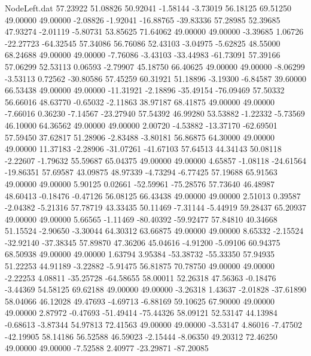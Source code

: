 \begin{filecontents}{NodeLeft.dat}
  57.23922   51.08826   50.92041    -1.58144   -3.73019   56.18125   69.51250   49.00000   49.00000   -2.08826   -1.92041  -16.88765  -39.83336
  57.28985   52.39685   47.93274    -2.01119   -5.80731   53.85625   71.64062   49.00000   49.00000   -3.39685    1.06726  -22.27723  -64.32545
  57.34086   56.76086   52.43103    -3.04975   -5.62825   48.55000   68.24688   49.00000   49.00000   -7.76086   -3.43103  -33.44983  -61.73091
  57.39166   57.06299   52.53113     0.06593   -2.79907   45.18750   66.40625   49.00000   49.00000   -8.06299   -3.53113    0.72562  -30.80586
  57.45259   60.31921   51.18896    -3.19300   -6.84587   39.60000   66.53438   49.00000   49.00000  -11.31921   -2.18896  -35.49154  -76.09469
  57.50332   56.66016   48.63770    -0.65032   -2.11863   38.97187   68.41875   49.00000   49.00000   -7.66016    0.36230   -7.14567  -23.27940
  57.54392   46.99280   53.53882    -1.22332   -5.73569   46.10000   64.36562   49.00000   49.00000    2.00720   -4.53882  -13.37170  -62.69501
  57.59450   37.62817   51.28906    -2.83488   -3.80181   56.86875   64.30000   49.00000   49.00000   11.37183   -2.28906  -31.07261  -41.67103
  57.64513   44.34143   50.08118    -2.22607   -1.79632   55.59687   65.04375   49.00000   49.00000    4.65857   -1.08118  -24.61564  -19.86351
  57.69587   43.09875   48.97339    -4.73294   -6.77425   57.19688   65.91563   49.00000   49.00000    5.90125    0.02661  -52.59961  -75.28576
  57.73640   46.48987   48.60413    -0.18476   -0.47126   56.08125   66.43438   49.00000   49.00000    2.51013    0.39587   -2.04382   -5.21316
  57.78719   43.33435   50.11469    -7.31144   -5.44919   59.28437   65.20937   49.00000   49.00000    5.66565   -1.11469  -80.40392  -59.92477
  57.84810   40.34668   51.15524    -2.90650   -3.30044   64.30312   63.66875   49.00000   49.00000    8.65332   -2.15524  -32.92140  -37.38345
  57.89870   47.36206   45.04616    -4.91200   -5.09106   60.94375   68.50938   49.00000   49.00000    1.63794    3.95384  -53.38732  -55.33350
  57.94935   51.22253   44.91189    -3.22882   -5.91475   56.81875   70.78750   49.00000   49.00000   -2.22253    4.08811  -35.25728  -64.58655
  58.00011   52.26318   47.56363    -0.18476   -3.44369   54.58125   69.62188   49.00000   49.00000   -3.26318    1.43637   -2.01828  -37.61890
  58.04066   46.12028   49.47693    -4.69713   -6.88169   59.10625   67.90000   49.00000   49.00000    2.87972   -0.47693  -51.49414  -75.44326
  58.09121   52.53147   44.13984    -0.68613   -3.87344   54.97813   72.41563   49.00000   49.00000   -3.53147    4.86016   -7.47502  -42.19905
  58.14186   56.52588   46.59023    -2.15444   -8.06350   49.20312   72.46250   49.00000   49.00000   -7.52588    2.40977  -23.29871  -87.20085

\end{filecontents}
